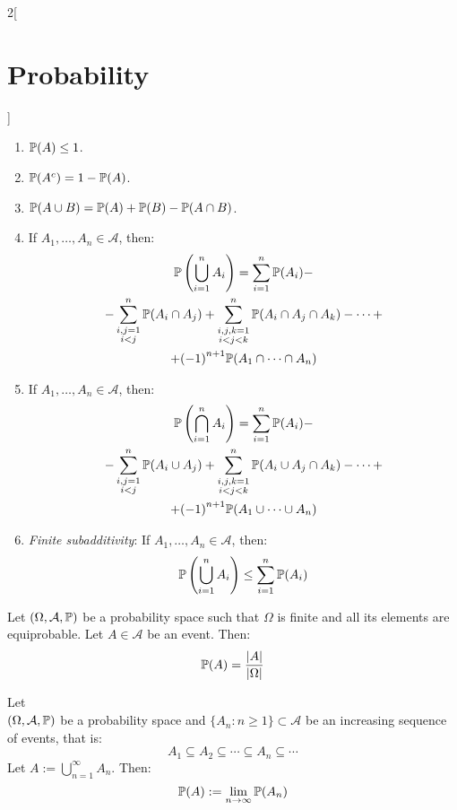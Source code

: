 \documentclass[../../../main.tex]{subfiles}
\begin{document}
\begin{multicols}{2}[\section{Probability}]
\begin{prop}
\begin{enumerate}
      \item $\mathbb{P}(A)\leq 1$.
      \item $\mathbb{P}(A^c)=1-\mathbb{P}(A)$.
      \item $\mathbb{P}(A\cup B) =\mathbb{P}(A)+\mathbb{P}(B)-\mathbb{P}(A\cap B)$.
      \item If $A_1,\ldots,A_n\in\mathcal{A}$, then:
            \begin{multline*}
              \mathbb{P}\left(\bigcup_{i=1}^n A_i\right)=\sum_{i=1}^n \mathbb{P}(A_i)-\\-\sum_{\substack{i,j=1\\i<j}}^n\mathbb{P}(A_i\cap A_j)+\sum_{\substack{i,j,k=1\\i<j<k}}^n\mathbb{P}(A_i\cap A_j\cap A_k)-\cdots+\\+{(-1)}^{n+1}\mathbb{P}(A_1\cap\cdots\cap A_n)
            \end{multline*}
      \item If $A_1,\ldots,A_n\in\mathcal{A}$, then:
            \begin{multline*}
              \mathbb{P}\left(\bigcap_{i=1}^n A_i\right)=\sum_{i=1}^n \mathbb{P}(A_i)-\\-\sum_{\substack{i,j=1\\i<j}}^n\mathbb{P}(A_i\cup A_j)+\sum_{\substack{i,j,k=1\\i<j<k}}^n\mathbb{P}(A_i\cup A_j\cap A_k)-\cdots+\\+{(-1)}^{n+1}\mathbb{P}(A_1\cup\cdots\cup A_n)
            \end{multline*}
      \item \textit{Finite subadditivity}: If $A_1,\ldots,A_n\in\mathcal{A}$, then: $$\mathbb{P}\left(\bigcup_{i=1}^n A_i\right)\leq\sum_{i=1}^n \mathbb{P}(A_i)$$
    \end{enumerate}
  \end{prop}
  \begin{prop}
    Let $(\Omega,\mathcal{A},\mathbb{P})$ be a probability space such that $\Omega$ is finite and all its elements are equiprobable. Let $A\in\mathcal{A}$ be an event. Then: $$\mathbb{P}(A)=\frac{|A|}{|\Omega|}$$
  \end{prop}
  \begin{theorem}
    Let\\ $(\Omega,\mathcal{A},\mathbb{P})$ be a probability space and $\{A_n:n\geq 1\}\subset\mathcal{A}$ be an increasing sequence of events, that is: $$A_1\subseteq A_2\subseteq\cdots\subseteq A_n\subseteq\cdots$$ Let $A:=\bigcup_{n=1}^\infty A_n$. Then: $$\mathbb{P}(A):=\lim_{n\to\infty}\mathbb{P}(A_n)$$
  \end{theorem}

\end{multicols}
\end{document}
